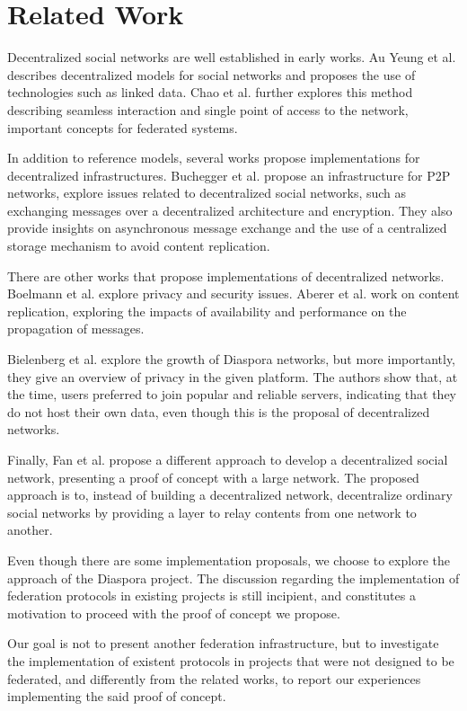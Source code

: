 \chapter{Related Work}
\label{chapter:3}

Decentralized social networks are well established in early works.
Au Yeung et al. \cite{yeung2009} describes decentralized models for social
networks and proposes the use of technologies such as linked data. Chao et
al. \cite{chao2012} further explores this method describing seamless
interaction and single point of access to the network, important concepts
for federated systems.

In addition to reference models, several works propose implementations
for decentralized infrastructures. Buchegger et al. \cite{p2pInsights2009}
propose an infrastructure for P2P networks, explore issues related to
decentralized social networks, such as exchanging messages over a decentralized
architecture and encryption.  They also provide insights on asynchronous
message exchange and the use of a centralized storage mechanism to avoid
content replication.

There are other works that propose implementations of decentralized networks.
Boelmann et al. \cite{sonet2013} explore privacy and security issues. Aberer et
al. \cite{my32012} work on content replication, exploring the impacts of
availability and performance on the propagation of messages.

Bielenberg et al. \cite{diasporaGrowth2012} explore the growth of Diaspora
networks, but more importantly, they give an overview of privacy in the given
platform. The authors show that, at the time, users preferred to join popular
and reliable servers, indicating that they do not host their own data, even
though this is the proposal of decentralized networks.

Finally, Fan et al. \cite{snsapi2014} propose a different approach to develop a
decentralized social network, presenting a proof of concept with a large
network. The proposed approach is to, instead of building a decentralized
network, decentralize ordinary social networks by providing a layer to relay
contents from one network to another.

Even though there are some implementation proposals, we choose to explore the
approach of the Diaspora project. The discussion regarding the implementation
of federation protocols in existing projects is still incipient, and constitutes
a motivation to proceed with the proof of concept we propose.

Our goal is not to present another federation infrastructure, but to
investigate the implementation of existent protocols in projects that were not
designed to be federated, and differently from the related works, to report our
experiences implementing the said proof of concept.
